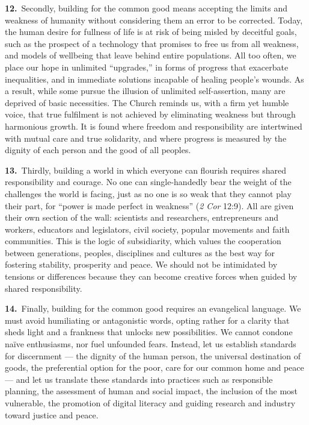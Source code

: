 \documentclass{article}
\begin{document}
\textbf{12.}\ Secondly, building for the common good means accepting the limits and weakness of humanity without considering them an error to be corrected. Today, the human desire for fullness of life is at risk of being misled by deceitful goals, such as the prospect of a technology that promises to free us from all weakness, and models of wellbeing that leave behind entire populations. All too often, we place our hope in unlimited ``upgrades,'' in forms of progress that exacerbate inequalities, and in immediate solutions incapable of healing people's wounds. As a result, while some pursue the illusion of unlimited self-assertion, many are deprived of basic necessities. The Church reminds us, with a firm yet humble voice, that true fulfilment is not achieved by eliminating weakness but through harmonious growth. It is found where freedom and responsibility are intertwined with mutual care and true solidarity, and where progress is measured by the dignity of each person and the good of all peoples.

\textbf{13.}\ Thirdly, building a world in which everyone can flourish requires shared responsibility and courage. No one can single-handedly bear the weight of the challenges the world is facing, just as no one is so weak that they cannot play their part, for ``power is made perfect in weakness'' (\emph{2 Cor} 12:9). All are given their own section of the wall: scientists and researchers, entrepreneurs and workers, educators and legislators, civil society, popular movements and faith communities. This is the logic of subsidiarity, which values the cooperation between generations, peoples, disciplines and cultures as the best way for fostering stability, prosperity and peace. We should not be intimidated by tensions or differences because they can become creative forces when guided by shared responsibility.

\textbf{14.}\ Finally, building for the common good requires an evangelical language. We must avoid humiliating or antagonistic words, opting rather for a clarity that sheds light and a frankness that unlocks new possibilities. We cannot condone naïve enthusiasms, nor fuel unfounded fears. Instead, let us establish standards for discernment --- the dignity of the human person, the universal destination of goods, the preferential option for the poor, care for our common home and peace --- and let us translate these standards into practices such as responsible planning, the assessment of human and social impact, the inclusion of the most vulnerable, the promotion of digital literacy and guiding research and industry toward justice and peace.
\end{document}
